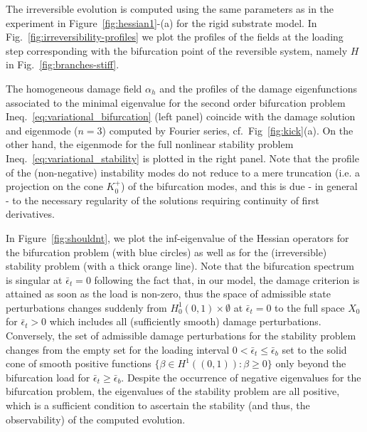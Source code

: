 The irreversible evolution is computed using the same parameters as in the experiment in Figure~\ref{fig:hessian1}-(a) for the rigid substrate model. In Fig.~\ref{fig:irreversibility-profiles} we plot the profiles of the fields at the loading step corresponding with the bifurcation point of the reversible system, namely $H$ in Fig.~\ref{fig:branches-stiff}.

The homogeneous damage field $\alpha_h$ and the profiles of the damage eigenfunctions associated to the minimal eigenvalue for the second order bifurcation problem Ineq.~\eqref{eq:variational_bifurcation} (left panel) coincide with the damage solution and eigenmode ($n=3$) computed by Fourier series, {cf.~Fig~\ref{fig:kick}(a).}
On the other hand, the eigenmode for the full nonlinear stability problem Ineq.~\eqref{eq:variational_stability} is plotted in the right panel.
Note that the profile of the (non-negative) instability modes do not reduce to a mere truncation (i.e. a projection on the cone $K^+_0$) of the bifurcation modes, and this is due - in general - to the necessary regularity of the solutions requiring continuity of first derivatives. 


In Figure~\ref{fig:shouldnt}, we plot the inf-eigenvalue of the Hessian operators for the bifurcation problem (with blue circles) as well as for the (irreversible) stability problem (with a thick orange line). 
Note that the bifurcation spectrum is singular at $\bar \epsilon_t=0$ following the fact that, in our model, the damage criterion is attained as soon as the load is non-zero, thus the space of admissible state perturbations changes suddenly from $H^1_0(0,1) \times \emptyset$ at $\bar \epsilon_t=0$ to the full space $X_0$ for $\bar \epsilon_t>0$ which includes all (sufficiently smooth) damage perturbations. 
Conversely, the set of admissible damage perturbations for the stability problem changes from the empty set for the loading interval $0 < \bar\epsilon_t\leq \bar\epsilon_b$ set to the solid cone of smooth positive functions $\{\beta\in H^1((0,1)):\beta \geq 0\}$ only beyond the bifurcation load for $\bar\epsilon_t \geq \bar\epsilon_b$.
Despite the occurrence of negative eigenvalues for the bifurcation problem, the eigenvalues of the stability problem are all positive, which is a sufficient condition to ascertain the stability (and thus, the observability) of the computed evolution.

